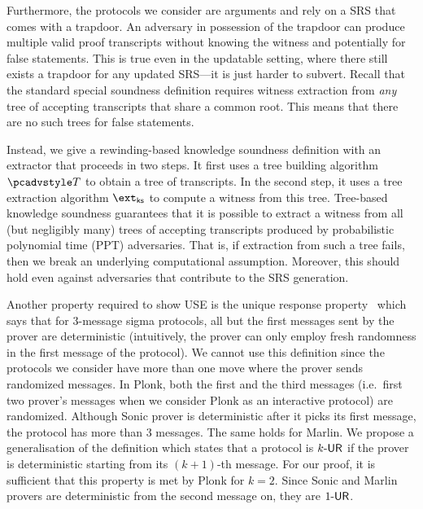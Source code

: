 Furthermore, the protocols we consider are arguments and rely on a SRS that comes with a trapdoor. An adversary in
possession of the trapdoor can produce multiple valid proof transcripts without
knowing the witness and potentially for false statements. This is true even in
the updatable setting, where there still exists a trapdoor for any updated SRS---it is just harder to subvert. Recall
that the standard special soundness definition requires witness extraction from
\emph{any} tree of accepting transcripts that share a common root. This means
that there are no such trees for false statements. 

Instead, we give a rewinding-based knowledge soundness definition with an extractor that proceeds in two steps. It first uses a tree building algorithm $\tdv$ to obtain a tree of transcripts. In the second step, it uses a tree extraction algorithm $\extcss$ to compute a witness from this tree. Tree-based knowledge soundness guarantees that it is possible to extract a witness from all
(but negligibly many) trees of accepting transcripts produced by probabilistic
polynomial time (PPT) adversaries. That
is, if extraction from such a tree fails, then we break an underlying
computational assumption. Moreover, this should hold even against adversaries
that contribute to the SRS generation.

  Another property
required to show USE is the unique response property~\cite{C:Fischlin05} which says
that for $3$-message sigma protocols, all but the first messages sent by the prover are
deterministic (intuitively, the prover can only employ fresh randomness in the first
message of the protocol). We cannot use this definition since the protocols
we consider have more than one move where the prover sends randomized messages. In
Plonk, both the first and the third messages (i.e.~first two prover's messages when
we consider Plonk as an interactive protocol) are randomized. Although Sonic prover
is deterministic after it picks its first message, the protocol has more than $3$
messages. The same holds for Marlin. We propose a generalisation of the definition which
states that a protocol is ${k\text{-}\mathsf{UR}}$ if the prover is deterministic starting from its
$(k + 1)$-th message. For our proof, it is sufficient that this property is met by Plonk
for $k = 2$. Since Sonic and Marlin provers are deterministic from the second message
on, they are ${1\text{-}\mathsf{UR}}$.


